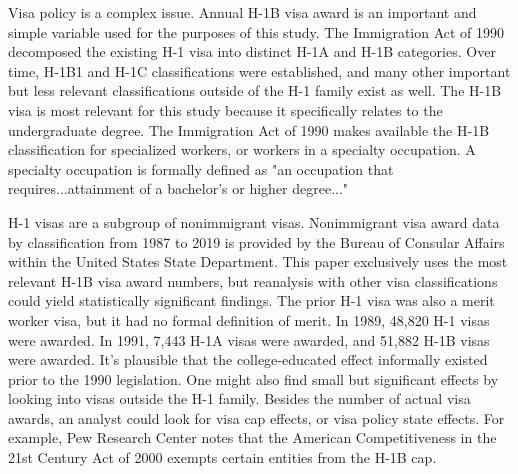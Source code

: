 \documentclass[review]{elsarticle}
\begin{document}
Visa policy is a complex issue.
Annual H-1B visa award is an important and simple variable used for the purposes of this study.
The Immigration Act of 1990 decomposed the existing H-1 visa into distinct H-1A and H-1B categories.
Over time, H-1B1 and H-1C classifications were established,
and many other important but less relevant classifications outside of the H-1 family exist as well.
The H-1B visa is most relevant for this study because it specifically relates to the undergraduate degree.
The Immigration Act of 1990 makes available the H-1B classification for specialized workers,
or workers in a specialty occupation.
A specialty occupation is formally defined as "an occupation that requires...attainment of a bachelor's or higher degree..."

H-1 visas are a subgroup of nonimmigrant visas.
Nonimmigrant visa award data by classification from 1987 to 2019 is provided by
the Bureau of Consular Affairs within the United States State Department\cite{bureauof_2020}.
This paper exclusively uses the most relevant H-1B visa award numbers,
but reanalysis with other visa classifications could yield statistically significant findings.
The prior H-1 visa was also a merit worker visa, but it had no formal definition of merit.
In 1989, 48,820 H-1 visas were awarded.
In 1991, 7,443 H-1A visas were awarded, and 51,882 H-1B visas were awarded.
It's plausible that the college-educated effect informally existed prior to the 1990 legislation.
One might also find small but significant effects by looking into visas outside the H-1 family.
Besides the number of actual visa awards, an analyst could look for visa cap effects,
or visa policy state effects.
For example, Pew Research Center notes that the American Competitiveness in the 21st Century Act of 2000 exempts certain entities from the H-1B cap\cite{ruiz2017key}.
\end{document}
